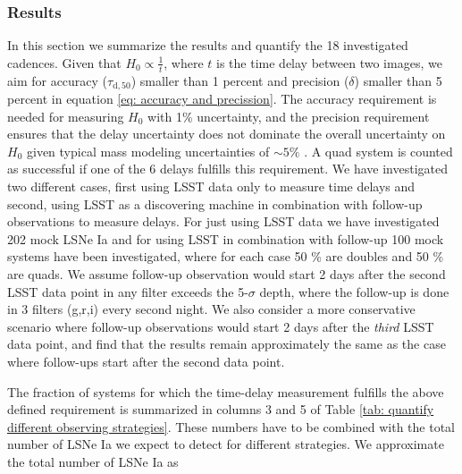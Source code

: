 \subsubsection{Results}
\label{sec:results}
In this section we summarize the results and quantify the 18
investigated cadences. Given that $H_0 \propto \frac{1}{t}$, where $t$
is the time delay between two images, we aim for accuracy
($\tau_\mathrm{d,50}$) smaller than 1 percent and precision ($\delta$)
smaller than 5 percent in equation \ref{eq: accuracy and precission}. The accuracy
requirement is needed for measuring $H_0$ with 1\% uncertainty, and
the precision requirement ensures that the delay uncertainty does not
dominate the overall uncertainty on $H_0$ given typical mass modeling
uncertainties of $\sim 5\%$ \citep[e.g.,][]{Suyu2018}.  A quad system is counted as successful if one of the 6 delays fulfills this requirement. We have investigated two different cases, first using LSST data only to measure time delays and second, using LSST as a discovering machine in combination with follow-up observations to measure delays. For just using LSST data we have investigated 202 mock LSNe Ia and for using LSST in combination with follow-up 100 mock systems have been investigated, where for each case 50 \% are doubles and 50 \% are quads. We assume follow-up observation would start 2 days after the second LSST data point in any filter exceeds the 5-$\sigma$ depth, where the follow-up is done in 3 filters (g,r,i) every second night. We also consider a more conservative scenario where follow-up observations would start 2 days after the \textit{third} LSST data point, and find that the results remain approximately the same as the case where follow-ups start after the second data point.
 
The fraction of systems for which the time-delay measurement fulfills the above defined requirement is summarized in columns 3 and 5 of Table \ref{tab: quantify different observing strategies}. These numbers have to be combined with the total number of LSNe Ia we expect to detect for different strategies. We approximate the total number of LSNe Ia as

